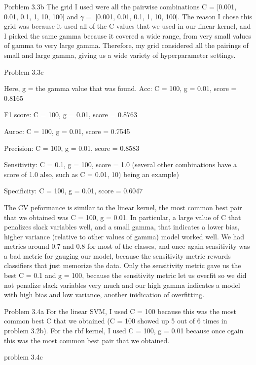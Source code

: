 \documentclass[11pt]{article}
\newcommand{\solution}[1]{{{\color{blue}{\bf Solution:} {#1}}}}
\begin{document}
\item Porblem 3.3b
\solution{
The grid I used were all the pairwise combinations C = [0.001, 0.01, 0.1, 1, 10, 100] and $\gamma=$ [0.001, 0.01, 0.1, 1, 10, 100]. The reason I chose this grid was because it used all of the C values that we used in our linear kernel, and I picked the same gamma because it covered a wide range, from very small values of gamma to very large gamma. Therefore, my grid considered all the pairings of small and large gamma, giving us a wide variety of hyperparameter settings. 
}

\item Problem 3.3c
\solution{ Here, g = the gamma value that was found. \newline{}
Acc: C = 100, g = 0.01, score = 0.8165

F1 score: C = 100, g = 0.01, score = 0.8763

Auroc: C = 100, g = 0.01, score = 0.7545

Precision: C = 100, g = 0.01, score = 0.8583

Sensitivity: C = 0.1, g = 100, score = 1.0 (several other combinations have a score of 1.0 also, such as C = 0.01, 10) being an example)

Specificity: C = 100, g = 0.01, score = 0.6047

\newline{}

\newline{}

The CV peformance is similar to the linear kernel, the most common best pair that we obtained was C = 100, g = 0.01. In particular, a large value of C that penalizes slack variables well, and a small gamma, that indicates a lower bias, higher variance (relative to other values of gamma) model worked well. We had metrics around 0.7 and 0.8 for most of the classes, and once again sensitivity was a bad metric for gauging our model, because the sensitivity metric rewards classifiers that just memorize the data. Only the sensitivity metric gave us the best C = 0.1 and g = 100, because the sensitivity metric let us overfit so we did not penalize slack variables very much and our high gamma indicates a model with high bias and low variance, another inidication of overfitting. 
}
\item Problem 3.4a
\solution{
For the linear SVM, I used C = 100 because this was the most common best C that we obtained (C = 100 showed up 5 out of 6 times in problem 3.2b). For the rbf kernel, I used C = 100, g = 0.01 because once ogain this was the most common best pair that we obtained. 
}
\newpage
\item problem 3.4c
\end{document}
